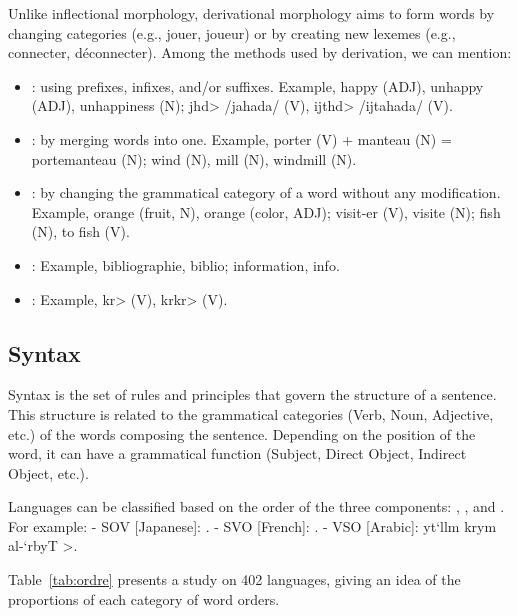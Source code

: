 \documentclass{KBook}
\begin{document}
Unlike inflectional morphology, derivational morphology aims to form words by changing categories (e.g., jouer, joueur) or by creating new lexemes (e.g., connecter, déconnecter). Among the methods used by derivation, we can mention:
\begin{itemize}
	\item {}: using prefixes, infixes, and/or suffixes. Example, happy (ADJ), unhappy (ADJ), unhappiness (N); \<jhd> /jahada/ (V), \<ijthd> /ijtahada/ (V).
	
	\item {}: by merging words into one. Example, porter (V) + manteau (N) = portemanteau (N); wind (N), mill (N), windmill (N).
	
	\item {}: by changing the grammatical category of a word without any modification. Example, orange (fruit, N), orange (color, ADJ); visit-er (V), visite (N); fish (N), to fish (V).
	
	\item {}: Example, bibliographie, biblio; information, info.
	
	\item {}: Example, \<kr> (V), \<krkr> (V).
\end{itemize}


\subsection{Syntax}

Syntax is the set of rules and principles that govern the structure of a sentence. This structure is related to the grammatical categories (Verb, Noun, Adjective, etc.) of the words composing the sentence. Depending on the position of the word, it can have a grammatical function (Subject, Direct Object, Indirect Object, etc.).

Languages can be classified based on the order of the three components: , , and . For example:
- SOV [Japanese]: .
- SVO [French]: .
- VSO [Arabic]: \<yt`llm \LR{[V]} krym \LR{[S]} al-`rbyT \LR{[O]}>.

Table~\ref{tab:ordre} presents a study on 402 languages, giving an idea of the proportions of each category of word orders.
\end{document}
